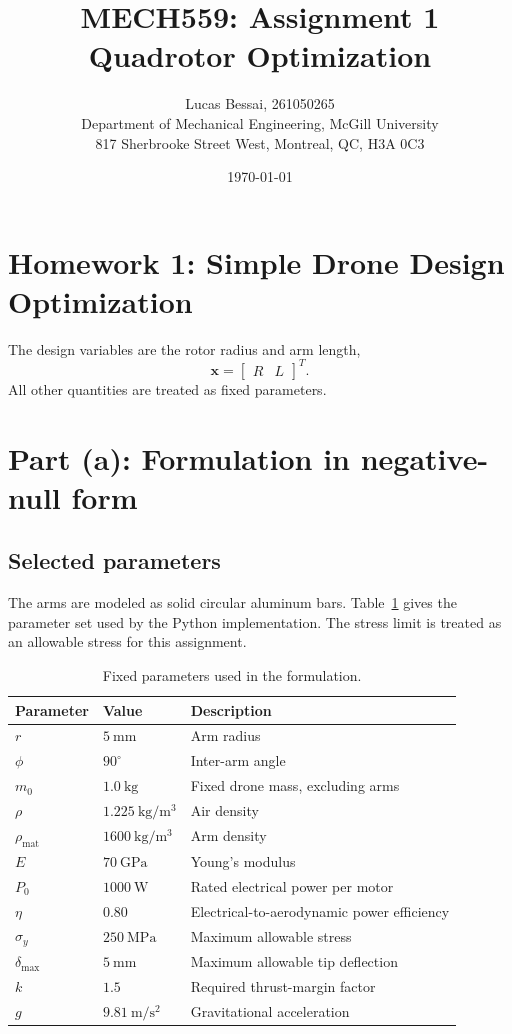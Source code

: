 \documentclass[11pt]{article}
\title{\textbf{MECH559: Assignment 1} \\ Quadrotor Optimization}
\author{Lucas Bessai, 261050265 \\ \small{Department of Mechanical Engineering, McGill University} \\ \small{817 Sherbrooke Street West, Montreal, QC, H3A 0C3}}
\date{\today}
\begin{document}
\maketitle

\tableofcontents

\section{Homework 1: Simple Drone Design Optimization}
The design variables are the rotor radius and arm length,
\begin{equation}
 \mathbf{x}=\begin{bmatrix}R & L\end{bmatrix}^{T}.
\end{equation}
All other quantities are treated as fixed parameters.

\section{Part (a): Formulation in negative-null form}

\subsection{Selected parameters}
The arms are modeled as solid circular aluminum bars. Table~\ref{tab:parameters} gives the parameter set used by the Python implementation. The stress limit is treated as an allowable stress for this assignment.

\begin{table}[h]
\centering
\caption{Fixed parameters used in the formulation.}
\label{tab:parameters}
\begin{tabular}{lll}
\toprule
Parameter & Value & Description \\
\midrule
$r$ & $5~\mathrm{mm}$ & Arm radius \\
$\phi$ & $90^\circ$ & Inter-arm angle \\
$m_0$ & $1.0~\mathrm{kg}$ & Fixed drone mass, excluding arms \\
$\rho$ & $1.225~\mathrm{kg/m^3}$ & Air density \\
$\rho_{\mathrm{mat}}$ & $1600~\mathrm{kg/m^3}$ & Arm density \\
$E$ & $70~\mathrm{GPa}$ & Young's modulus \\
$P_0$ & $1000~\mathrm{W}$ & Rated electrical power per motor \\
$\eta$ & $0.80$ & Electrical-to-aerodynamic power efficiency \\
$\sigma_y$ & $250~\mathrm{MPa}$ & Maximum allowable stress \\
$\delta_{\max}$ & $5~\mathrm{mm}$ & Maximum allowable tip deflection \\
$k$ & $1.5$ & Required thrust-margin factor \\
$g$ & $9.81~\mathrm{m/s^2}$ & Gravitational acceleration \\
\bottomrule
\end{tabular}
\end{table}
\end{document}

